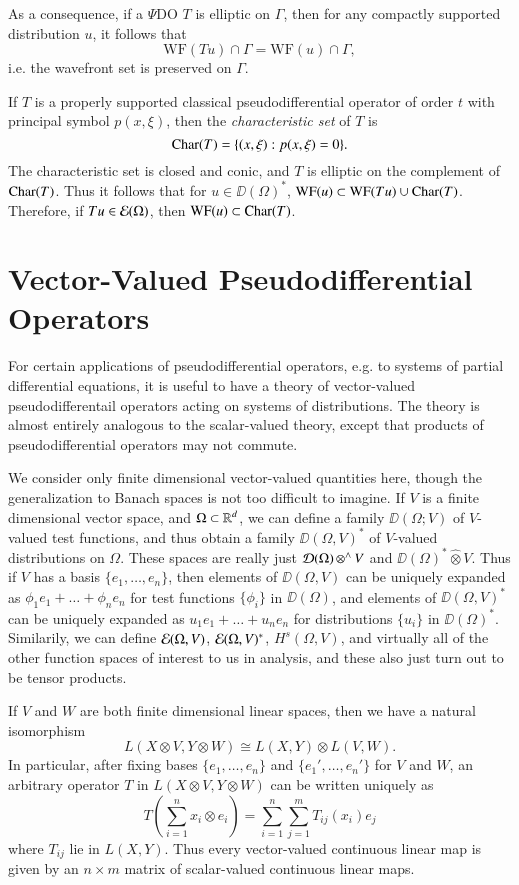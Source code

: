 As a consequence, if a $\Psi$DO $T$ is elliptic on $\Gamma$, then for any compactly supported distribution $u$, it follows that
%
\[ \text{WF}(Tu) \cap \Gamma = \text{WF}(u) \cap \Gamma, \]
%
i.e. the wavefront set is preserved on $\Gamma$.

If $T$ is a properly supported classical pseudodifferential operator of order $t$ with principal symbol $p(x,\xi)$, then the \emph{characteristic set} of $T$ is
%
\[ \operatorname{\text{Char}}(T) = \{ (x,\xi): p(x,\xi) = 0 \}. \]
%
The characteristic set is closed and conic, and $T$ is elliptic on the complement of $\operatorname{\text{Char}}(T)$. Thus it follows that for $u \in \DD(\Omega)^*$, $\text{WF}(u) \subset \text{WF}(Tu) \cup \operatorname{\text{Char}}(T)$. Therefore, if $Tu \in \operatorname{\mathcal{E}}(\Omega)$, then $\text{WF}(u) \subset \operatorname{\text{Char}}(T)$.





\section{Vector-Valued Pseudodifferential Operators}

For certain applications of pseudodifferential operators, e.g. to systems of partial differential equations, it is useful to have a theory of vector-valued pseudodifferentail operators acting on systems of distributions. The theory is almost entirely analogous to the scalar-valued theory, except that products of pseudodifferential operators may not commute.

We consider only finite dimensional vector-valued quantities here, though the generalization to Banach spaces is not too difficult to imagine. If $V$ is a finite dimensional vector space, and $\Omega \subset \operatorname{\mathbb{R}}^d$, we can define a family $\DD(\Omega;V)$ of $V$-valued test functions, and thus obtain a family $\DD(\Omega,V)^*$ of $V$-valued distributions on $\Omega$. These spaces are really just $\operatorname{\mathcal{D}}(\Omega) \operatorname{{{\otimes}^\wedge}} V$ and $\DD(\Omega)^* \widehat{\otimes} V$. Thus if $V$ has a basis $\{ e_1, \dots, e_n \}$, then elements of $\DD(\Omega,V)$ can be uniquely expanded as $\phi_1 e_1 + \dots + \phi_n e_n$ for test functions $\{ \phi_i \}$ in $\DD(\Omega)$, and elements of $\DD(\Omega,V)^*$ can be uniquely expanded as $u_1 e_1 + \dots + u_n e_n$ for distributions $\{ u_i \}$ in $\DD(\Omega)^*$. Similarily, we can define $\operatorname{\mathcal{E}}(\Omega,V)$, $\operatorname{\mathcal{E}}(\Omega,V)^*$, $H^s(\Omega,V)$, and virtually all of the other function spaces of interest to us in analysis, and these also just turn out to be tensor products.

If $V$ and $W$ are both finite dimensional linear spaces, then we have a natural isomorphism
%
\[ L(X \otimes V, Y \otimes W) \cong L(X,Y) \otimes L(V,W). \]
%
In particular, after fixing bases $\{ e_1, \dots, e_n \}$ and $\{ e_1', \dots, e_n' \}$ for $V$ and $W$, an arbitrary operator $T$ in $L(X \otimes V, Y \otimes W)$ can be written uniquely as
%
\[ T \left( \sum_{i = 1}^n x_i \otimes e_i \right) = \sum_{i = 1}^n \sum_{j = 1}^m T_{ij}(x_i) e_j \]
%
where $T_{ij}$ lie in $L(X,Y)$. Thus every vector-valued continuous linear map is given by an $n \times m$ matrix of scalar-valued continuous linear maps.

